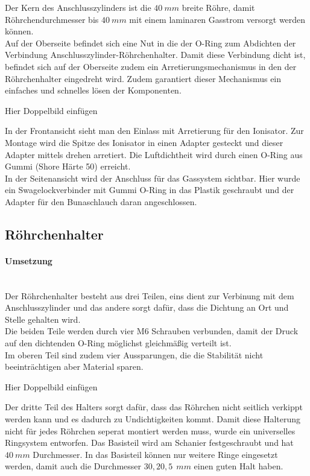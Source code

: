 Der Kern des Anschlusszylinders ist die $\SI{40}{mm}$ breite Röhre, damit Röhrchendurchmesser bis $\SI{40}{mm}$ mit einem laminaren Gasstrom versorgt werden können. \\
Auf der Oberseite befindet sich eine Nut in die der O-Ring zum Abdichten der Verbindung Anschlusszylinder-Röhrchenhalter. Damit diese Verbindung dicht ist, befindet sich auf der Oberseite zudem ein Arretierungsmechanismus in den der Röhrchenhalter eingedreht wird. Zudem garantiert dieser Mechanismus ein einfaches und schnelles lösen der Komponenten.


Hier Doppelbild einfügen


In der Frontansicht sieht man den Einlass mit Arretierung für den Ionisator. Zur Montage wird die Spitze des Ionisator in einen Adapter gesteckt und dieser Adapter mittels drehen arretiert. Die Luftdichtheit wird durch einen O-Ring aus Gummi (Shore Härte 50) erreicht. \\
In der Seitenansicht wird der Anschluss für das Gassystem sichtbar. Hier wurde ein Swagelockverbinder mit Gummi O-Ring in das Plastik geschraubt und der Adapter für den Bunaschlauch daran angeschlossen.


\subsection{Röhrchenhalter}

\paragraph{Umsetzung}

\hfill \\

Der Röhrchenhalter besteht aus drei Teilen, eins dient zur Verbinung mit dem Anschlusszylinder und das andere sorgt dafür, dass die Dichtung an Ort und Stelle gehalten wird. \\
Die beiden Teile werden durch vier M6 Schrauben verbunden, damit der Druck auf den dichtenden O-Ring möglichst gleichmäßig verteilt ist. \\
Im oberen Teil sind zudem vier Aussparungen, die die Stabilität nicht beeinträchtigen aber Material sparen. 

Hier Doppelbild einfügen


Der dritte Teil des Halters sorgt dafür, dass das Röhrchen nicht seitlich verkippt werden kann und es dadurch zu Undichtigkeiten kommt. Damit diese Halterung nicht für jedes Röhrchen seperat montiert werden muss, wurde ein universelles Ringsystem entworfen. Das Basisteil wird am Schanier festgeschraubt und hat $\SI{40}{mm}$ Durchmesser. In das Basisteil können nur weitere Ringe eingesetzt werden, damit auch die Durchmesser $30,20,5\SI{}{\ mm}$ einen guten Halt haben.


